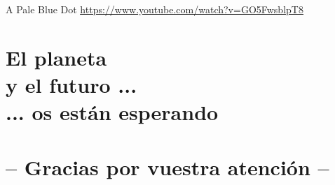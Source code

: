\documentclass[14pt,aspectratio=169,t]{beamer}
\begin{document}
\begin{frame}{A Pale Blue Dot}
  \href{https://www.youtube.com/watch?v=GO5FwsblpT8}
      {\color{blue}\underline{https://www.youtube.com/watch?v=GO5FwsblpT8}}
\end{frame}

\section{\LARGE \textbf{El planeta\\y el futuro ...\\\vspace{0.15in}... os están esperando}}
\section{\LARGE \textbf{-- Gracias por vuestra atención --}}
\end{document}
